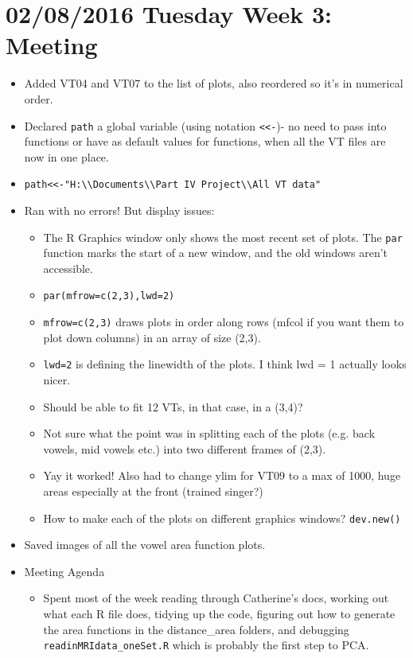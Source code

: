 \documentclass{article}
\begin{document}
\section*{02/08/2016 Tuesday Week 3: Meeting}
\begin{itemize}
    \item Added VT04 and VT07 to the list of plots, also reordered so it's in numerical order.
    \item Declared \verb|path| a global variable (using notation \verb|<<-|)- no need to pass into functions or have as default values for functions, when all the VT files are now in one place.
    \item \verb|path<<-"H:\\Documents\\Part IV Project\\All VT data"|
    \item Ran with no errors! But display issues:
    \begin{itemize}
        \item The R Graphics window only shows the most recent set of plots. The \verb|par| function marks the start of a new window, and the old windows aren't accessible.
        \item \verb|par(mfrow=c(2,3),lwd=2)|
        \item \verb|mfrow=c(2,3)| draws plots in order along rows (mfcol if you want them to plot down columns) in an array of size (2,3).
        \item \verb|lwd=2| is defining the linewidth of the plots. I think lwd = 1 actually looks nicer.
        \item Should be able to fit 12 VTs, in that case, in a (3,4)?
        \item Not sure what the point was in splitting each of the plots (e.g. back vowels, mid vowels etc.) into two different frames of (2,3).
        \item Yay it worked! Also had to change ylim for VT09 to a max of 1000, huge areas especially at the front (trained singer?)
        \item How to make each of the plots on different graphics windows? \verb|dev.new()|
    \end{itemize}
    \item Saved images of all the vowel area function plots.
    \item Meeting Agenda
    \begin{itemize}
        \item Spent most of the week reading through Catherine's docs, working out what each R file does, tidying up the code, figuring out how to generate the area functions in the distance\_area folders, and debugging \verb|readinMRIdata_oneSet.R| which is probably the first step to PCA.

\end{itemize}
\end{itemize}
\end{document}
